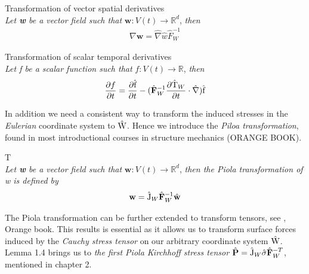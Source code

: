 \begin{lem}
Transformation of vector spatial derivatives \\
\textit{Let \textbf{w} be a vector field such that} $\mathbf{w}: V(t) \rightarrow \mathbb{R}^d$, \textit{then} 
\begin{align}
\nabla \mathbf{w} = \hat{\nabla}\hat{w} \hat{F}_W^{-1} 
\end{align} 
\end{lem}

\begin{lem}
Transformation of scalar temporal derivatives \\
\textit{Let f be a scalar function such that} $f: V(t) \rightarrow \mathbb{R}$, \textit{then} 
\begin{align}
\pder{f}{t} = \pder{\ha{f} }{t} - (\hat{F}_W^{-1} \pder{\ha{T}_W}{t} \cdot \hat{\nabla}) \ha{f}
\end{align} 
\end{lem}

In addition we need a consistent way to transform the induced stresses in the \textit{Eulerian} coordinate system to $\text{\^{W}}$. Hence we introduce the \textit{Piloa transformation}, found in most introductional courses in structure mechanics (ORANGE BOOK).
\\
\begin{lem}
T \\
\textit{Let \textbf{w} be a vector field such that} $\mathbf{w}: V(t) \rightarrow \mathbb{R}^d$, \textit{then the Piola transformation of w is defined by} 
\begin{align}
\mathbf{w} = \ha{J}_W \hat{F}^{-1}_W \hat{w}
\end{align} 
\end{lem}

The Piola transformation can be further extended to transform tensors, see \cite{Richter2016}, Orange book. This results is essential as it allows us to transform surface forces induced by the \textit{Cauchy stress tensor} on our arbitrary coordinate system $\text{\^{W}}$. Lemma 1.4 brings us to \textit{the first Piola Kirchhoff stress tensor} $\hat{P} = \ha{J}_W \hat{\sigma}\hat{F}_W^{-T}$, mentioned in chapter 2. 

